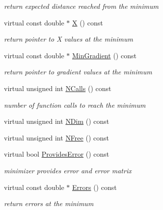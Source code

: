 \begin{DoxyCompactItemize}
\begin{DoxyCompactList}\small\item\em return expected distance reached from the minimum \end{DoxyCompactList}\item 
virtual const double $\ast$ \mbox{\hyperlink{classROOT_1_1Minuit2_1_1Minuit2Minimizer_ac9372eb08937cf14acb8862ba3166c26}{X}} () const
\begin{DoxyCompactList}\small\item\em return pointer to X values at the minimum \end{DoxyCompactList}\item 
virtual const double $\ast$ \mbox{\hyperlink{classROOT_1_1Minuit2_1_1Minuit2Minimizer_a52c6b3a13108b64366b1acd43f7e2b9a}{Min\+Gradient}} () const
\begin{DoxyCompactList}\small\item\em return pointer to gradient values at the minimum \end{DoxyCompactList}\item 
virtual unsigned int \mbox{\hyperlink{classROOT_1_1Minuit2_1_1Minuit2Minimizer_ab5faf7c3dc0b3743eee8352c62a6ccfd}{N\+Calls}} () const
\begin{DoxyCompactList}\small\item\em number of function calls to reach the minimum \end{DoxyCompactList}\item 
virtual unsigned int \mbox{\hyperlink{classROOT_1_1Minuit2_1_1Minuit2Minimizer_a6ed2c7d99296e222f0f43295e302eb9e}{N\+Dim}} () const
\item 
virtual unsigned int \mbox{\hyperlink{classROOT_1_1Minuit2_1_1Minuit2Minimizer_a0aa136c5a94d1e5c6bfcbfb98da7ad2d}{N\+Free}} () const
\item 
virtual bool \mbox{\hyperlink{classROOT_1_1Minuit2_1_1Minuit2Minimizer_a3a3a8abea38285fe639f2f0ec5505533}{Provides\+Error}} () const
\begin{DoxyCompactList}\small\item\em minimizer provides error and error matrix \end{DoxyCompactList}\item 
virtual const double $\ast$ \mbox{\hyperlink{classROOT_1_1Minuit2_1_1Minuit2Minimizer_a69c6dd9654ce41856814b358570cb9d7}{Errors}} () const
\begin{DoxyCompactList}\small\item\em return errors at the minimum \end{DoxyCompactList}\item 

\end{DoxyCompactItemize}
